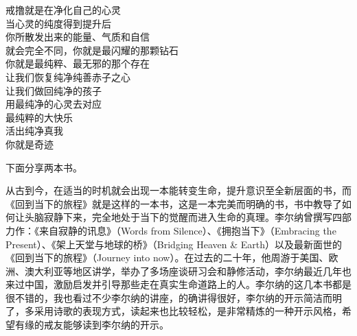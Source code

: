 \begin{adjustwidth}{-1.5em}{-1.5em}
\begin{poem}[纯净纯善赤子之心]
\begin{multicols}{2}
            戒撸就是在净化自己的心灵 \\ 当心灵的纯度得到提升后 \\ 你所散发出来的能量、气质和自信 \\ 就会完全不同，你就是最闪耀的那颗钻石 \\ 你就是最纯粹、最无邪的那个存在 \\ 让我们恢复纯净纯善赤子之心 \\ 让我们做回纯净的孩子 \\ 用最纯净的心灵去对应 \\ 最纯粹的大快乐 \\ 活出纯净真我 \\ 你就是奇迹
        \end{multicols}
    \end{poem}
\end{adjustwidth}

下面分享两本书。

\begin{book}
    从古到今，在适当的时机就会出现一本能转变生命，提升意识至全新层面的书，而《回到当下的旅程》就是这样的一本书，这是一本完美而明确的书，书中教导了如何让头脑寂静下来，完全地处于当下的觉醒而进入生命的真理。李尔纳曾撰写四部力作：《来自寂静的讯息》（Words from Silence）、《拥抱当下》（Embracing the Present）、《架上天堂与地球的桥》（Bridging Heaven \& Earth）以及最新面世的《回到当下的旅程》（Journey into now）。在过去的二十年，他周游于美国、欧洲、澳大利亚等地区讲学，举办了多场座谈研习会和静修活动，李尔纳最近几年也来过中国，激励启发并引导那些走在真实生命道路上的人。李尔纳的这几本书都是很不错的，我也看过不少李尔纳的讲座，的确讲得很好，李尔纳的开示简洁而明了，多采用诗歌的表现方式，读起来也比较轻松，是非常精炼的一种开示风格，希望有缘的戒友能够读到李尔纳的开示。
\end{book}

